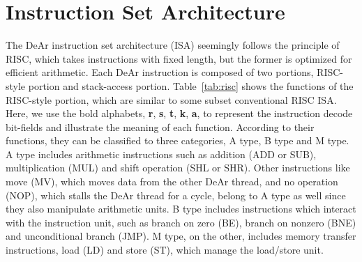 \section{Instruction Set Architecture}
\label{sec:isa}
\indent The DeAr instruction set architecture (ISA) seemingly follows the principle of RISC, which takes instructions with fixed length, 
but the former is optimized for efficient arithmetic.
Each DeAr instruction is composed of two portions, RISC-style portion and stack-access portion.
Table~\ref{tab:risc} shows the functions of the RISC-style portion, which are similar to some subset conventional RISC ISA.
Here, we use the bold alphabets, \textbf{r}, \textbf{s}, \textbf{t}, \textbf{k}, \textbf{a}, 
to represent the instruction decode bit-fields and illustrate the meaning of each function.
According to their functions, they can be classified to three categories, A type, B type and M type.
A type includes arithmetic instructions such as addition (ADD or SUB), multiplication (MUL) and shift operation (SHL or SHR).
Other instructions like move (MV), which moves data from the other DeAr thread, 
and no operation (NOP), which stalls the DeAr thread for a cycle, 
belong to A type as well since they also manipulate arithmetic units.
B type includes instructions which interact with the instruction unit, such as branch on zero (BE), branch on nonzero (BNE) and unconditional branch (JMP).
M type, on the other, includes memory transfer instructions, load (LD) and store (ST), which manage the load/store unit.
